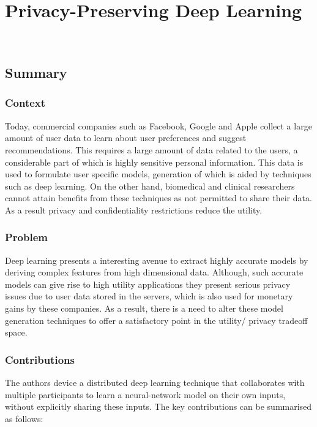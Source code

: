 \newpage
\section{Privacy-Preserving Deep Learning~\cite{Shokri:2015:PDL:2810103.2813687}}~\label{lect3}

\subsection{Summary} \label{lect3-sum}

\subsubsection{Context}

Today, commercial companies such as Facebook, Google and Apple collect a large amount of user data to learn 
about user preferences and suggest recommendations. This requires a large amount of data related to the users, 
a considerable part of which is highly sensitive personal information. This data is used to formulate user specific 
models, generation of which is aided by techniques such as deep learning. On the other hand, biomedical and 
clinical researchers cannot attain benefits from these techniques as not permitted to share their data. As 
a result privacy and confidentiality restrictions reduce the utility. 

\subsubsection{Problem}

Deep learning presents a interesting avenue to extract highly accurate models by deriving complex features from high
dimensional data. Although, such accurate models can give rise to high utility applications they present serious
privacy issues due to user data stored in the servers, which is also used for monetary gains by these companies. As 
a result, there is a need to alter these model generation techniques to offer a satisfactory point in the utility/
privacy tradeoff space. 

\subsubsection{Contributions}

The authors device a distributed deep learning technique that collaborates with multiple participants to learn a 
neural-network model on their own inputs, without explicitly sharing these inputs. The key contributions can be 
summarised as follows: 

